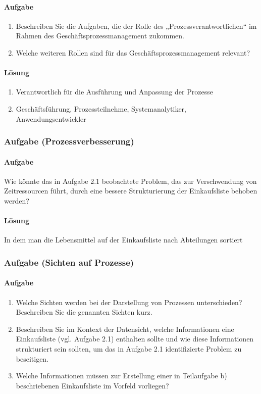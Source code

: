 \paragraph*{Aufgabe}
    \begin{enumerate}[label=\alph*)]
        \item Beschreiben Sie die Aufgaben, die der Rolle des „Prozessverantwortlichen“ im Rahmen des Geschäftsprozessmanagement zukommen.
        \item Welche weiteren Rollen sind für das Geschäftsprozessmanagement relevant?
    \end{enumerate}
   
\paragraph*{Lösung}
    \begin{enumerate}[label=\alph*)]
        \item Verantwortlich für die Ausführung und Anpassung der Prozesse
        \item Geschäftsführung, Prozessteilnehme, Systemanalytiker, Anwendungsentwickler
    \end{enumerate}

\subsubsection*{Aufgabe (Prozessverbesserung)}
\paragraph*{Aufgabe}
    Wie könnte das in Aufgabe 2.1 beobachtete Problem, das zur Verschwendung von Zeitressourcen führt, durch eine bessere Strukturierung der Einkaufsliste behoben werden?
   
\paragraph*{Lösung}
    In dem man die Lebensmittel auf der Einkaufsliste nach Abteilungen sortiert

\subsubsection*{Aufgabe (Sichten auf Prozesse)}
\paragraph*{Aufgabe}
    \begin{enumerate}[label=\alph*)]
        \item Welche Sichten werden bei der Darstellung von Prozessen unterschieden? Beschreiben Sie die genannten Sichten kurz.
        \item Beschreiben Sie im Kontext der Datensicht, welche Informationen eine Einkaufsliste (vgl. Aufgabe 2.1) enthalten sollte und wie diese Informationen strukturiert sein sollten, um das in Aufgabe 2.1 identifizierte Problem zu beseitigen.
        \item Welche Informationen müssen zur Erstellung einer in Teilaufgabe b) beschriebenen Einkaufsliste im Vorfeld vorliegen?
    \end{enumerate}
   
